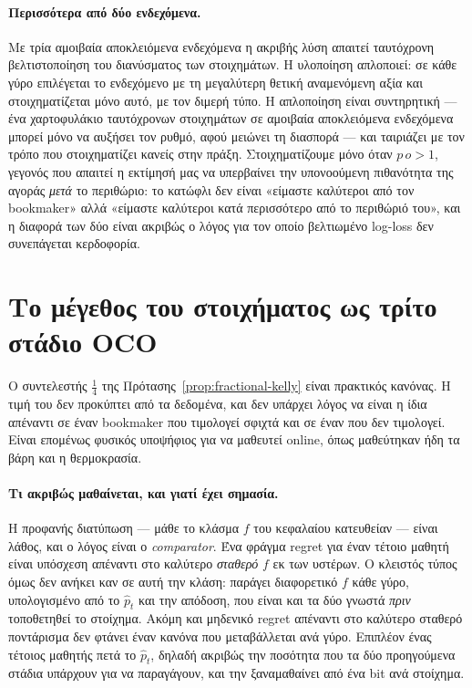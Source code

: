 \documentclass[12pt,a4paper,oneside]{report}
\renewcommand{\_}{\oldunderscore\allowbreak}
\theoremstyle{definition}
\theoremstyle{plain}
\theoremstyle{remark}
\begin{document}
\paragraph{Περισσότερα από δύο ενδεχόμενα.} Με τρία αμοιβαία αποκλειόμενα ενδεχόμενα η
ακριβής λύση απαιτεί ταυτόχρονη βελτιστοποίηση του διανύσματος των στοιχημάτων. Η υλοποίηση
απλοποιεί: σε κάθε γύρο επιλέγεται το ενδεχόμενο με τη μεγαλύτερη θετική αναμενόμενη αξία
και στοιχηματίζεται μόνο αυτό, με τον διμερή τύπο. Η απλοποίηση είναι συντηρητική --- ένα
χαρτοφυλάκιο ταυτόχρονων στοιχημάτων σε αμοιβαία αποκλειόμενα ενδεχόμενα μπορεί μόνο να
αυξήσει τον ρυθμό, αφού μειώνει τη διασπορά --- και ταιριάζει με τον τρόπο που στοιχηματίζει
κανείς στην πράξη. Στοιχηματίζουμε μόνο όταν $p\,o > 1$, γεγονός που απαιτεί η εκτίμησή μας
να υπερβαίνει την υπονοούμενη πιθανότητα της αγοράς \emph{μετά} το περιθώριο: το κατώφλι δεν
είναι «είμαστε καλύτεροι από τον bookmaker» αλλά «είμαστε καλύτεροι κατά περισσότερο από το
περιθώριό του», και η διαφορά των δύο είναι ακριβώς ο λόγος για τον οποίο βελτιωμένο
log-loss δεν συνεπάγεται κερδοφορία.

\section{Το μέγεθος του στοιχήματος ως τρίτο στάδιο OCO}
\label{sec:oco-kelly-theory}

Ο συντελεστής $\tfrac14$ της Πρότασης~\ref{prop:fractional-kelly} είναι πρακτικός κανόνας.
Η τιμή του δεν προκύπτει από τα δεδομένα, και δεν υπάρχει λόγος να είναι η ίδια απέναντι σε
έναν bookmaker που τιμολογεί σφιχτά και σε έναν που δεν τιμολογεί. Είναι επομένως φυσικός
υποψήφιος για να μαθευτεί online, όπως μαθεύτηκαν ήδη τα βάρη και η θερμοκρασία.

\paragraph{Τι ακριβώς μαθαίνεται, και γιατί έχει σημασία.} Η προφανής διατύπωση --- μάθε το
κλάσμα $f$ του κεφαλαίου κατευθείαν --- είναι λάθος, και ο λόγος είναι ο \emph{comparator}.
Ένα φράγμα regret για έναν τέτοιο μαθητή είναι υπόσχεση απέναντι στο καλύτερο
\emph{σταθερό} $f$ εκ των υστέρων. Ο κλειστός τύπος όμως δεν ανήκει καν σε αυτή την κλάση:
παράγει διαφορετικό $f$ κάθε γύρο, υπολογισμένο από το $\hat{p}_t$ και την απόδοση, που
είναι και τα δύο γνωστά \emph{πριν} τοποθετηθεί το στοίχημα. Ακόμη και μηδενικό regret
απέναντι στο καλύτερο σταθερό ποντάρισμα δεν φτάνει έναν κανόνα που μεταβάλλεται ανά γύρο.
Επιπλέον ένας τέτοιος μαθητής πετά το $\hat{p}_t$, δηλαδή ακριβώς την ποσότητα που τα δύο
προηγούμενα στάδια υπάρχουν για να παραγάγουν, και την ξαναμαθαίνει από ένα bit ανά
στοίχημα.
\end{document}
